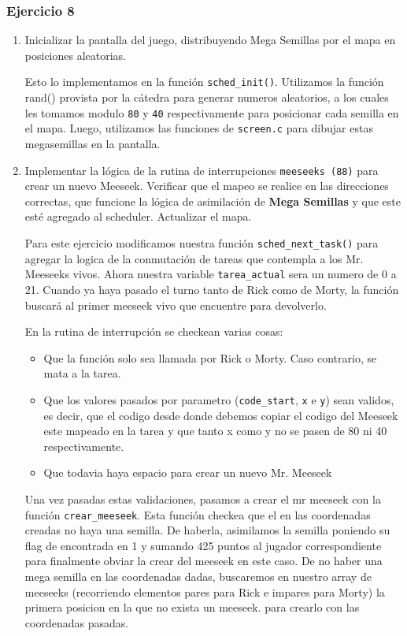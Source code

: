 \documentclass[a4paper]{article}
\begin{document}
\subsubsection{Ejercicio 8}

\begin{enumerate}
	\item Inicializar la pantalla del juego, distribuyendo Mega Semillas por el mapa en posiciones aleatorias.
	
	Esto lo implementamos en la funci\'on \texttt{sched\_init()}. Utilizamos la funci\'on rand() provista por la c\'atedra para generar numeros aleatorios, a los cuales les tomamos modulo \texttt{80} y \texttt{40} respectivamente para posicionar cada semilla en el mapa. Luego, utilizamos las funciones de \texttt{screen.c} para dibujar estas megasemillas en la pantalla.
	
	\item Implementar la l\'ogica de la rutina de interrupciones \texttt{meeseeks (88)} para crear un nuevo Meeseek. Verificar que el mapeo se realice en las direcciones correctas, que funcione la l\'ogica de asimilaci\'on de \textbf{Mega Semillas} y que este est\'e agregado al scheduler. Actualizar el mapa.
	
	Para este ejercicio modificamos nuestra funci\'on \texttt{sched\_next\_task()} para agregar la logica de la conmutaci\'on de tareas que contempla a los Mr. Meeseeks vivos. Ahora nuestra variable \texttt{tarea\_actual} sera un numero de 0 a 21. Cuando ya haya pasado el turno tanto de Rick como de Morty, la funci\'on buscar\'a al primer meeseek vivo que encuentre para devolverlo.
	
	En la rutina de interrupci\'on se checkean varias cosas: 
	
	\begin{itemize}
		\item Que la funci\'on solo sea llamada por Rick o Morty. Caso contrario, se mata a la tarea.
		\item Que los valores pasados por parametro (\texttt{code\_start}, \texttt{x} e \texttt{y}) sean validos, es decir, que el codigo desde donde debemos copiar el codigo del Meeseek este mapeado en la tarea y que tanto x como y no se pasen de 80 ni 40 respectivamente.
		\item Que todavia haya espacio para crear un nuevo Mr. Meeseek
	\end{itemize}
	
	Una vez pasadas estas validaciones, pasamos a crear el mr meeseek con la funci\'on \texttt{crear\_meeseek}. Esta funci\'on checkea que el en las coordenadas creadas no haya una semilla. De haberla, asimilamos la semilla poniendo su flag de encontrada en 1 y sumando 425 puntos al jugador correspondiente para finalmente obviar la crear del meeseek en este caso. De no haber una mega semilla en las coordenadas dadas, buscaremos en nuestro array de meeseeks (recorriendo elementos pares para Rick e impares para Morty) la primera posicion en la que no exista un meeseek. para crearlo con las coordenadas pasadas.


\end{enumerate}
\end{document}
